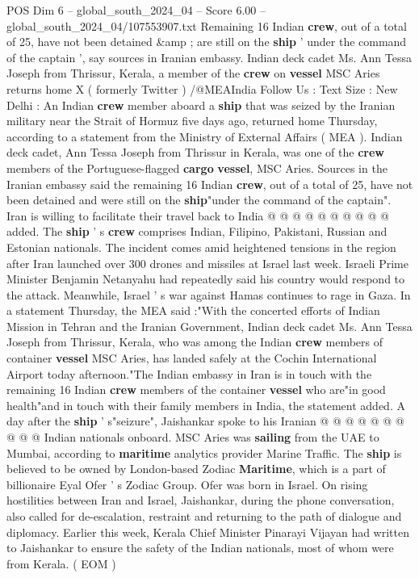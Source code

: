 \begin{textsample}{POS Dim 6 – global\_south\_2024\_04 – Score 6.00 – global\_south\_2024\_04/107553907.txt}  \label{ex:f6_pos_128}
Remaining 16 Indian \textbf{crew}, out of a total of 25, have not been detained \&amp ; are still on the \textbf{ship} ' under the command of the captain ', say sources in Iranian embassy.
Indian deck cadet Ms.
Ann Tessa Joseph from Thrissur, Kerala, a member of the \textbf{crew} on \textbf{vessel} MSC Aries returns home X ( formerly Twitter ) /@MEAIndia Follow Us : Text Size : New Delhi : An Indian \textbf{crew} member aboard a \textbf{ship} that was seized by the Iranian military near the Strait of Hormuz five days ago, returned home Thursday, according to a statement from the Ministry of External Affairs ( MEA ).
Indian deck cadet, Ann Tessa Joseph from Thrissur in Kerala, was one of the \textbf{crew} members of the Portuguese-flagged \textbf{cargo} \textbf{vessel}, MSC Aries.
Sources in the Iranian embassy said the remaining 16 Indian \textbf{crew}, out of a total of 25, have not been detained and were still on the \textbf{ship}"under the command of the captain".
Iran is willing to facilitate their travel back to India @ @ @ @ @ @ @ @ @ @ added.
The \textbf{ship} ' s \textbf{crew} comprises Indian, Filipino, Pakistani, Russian and Estonian nationals.
The incident comes amid heightened tensions in the region after Iran launched over 300 drones and missiles at Israel last week.
Israeli Prime Minister Benjamin Netanyahu had repeatedly said his country would respond to the attack.
Meanwhile, Israel ' s war against Hamas continues to rage in Gaza.
In a statement Thursday, the MEA said :"With the concerted efforts of Indian Mission in Tehran and the Iranian Government, Indian deck cadet Ms.
Ann Tessa Joseph from Thrissur, Kerala, who was among the Indian \textbf{crew} members of container \textbf{vessel} MSC Aries, has landed safely at the Cochin International Airport today afternoon."The Indian embassy in Iran is in touch with the remaining 16 Indian \textbf{crew} members of the container \textbf{vessel} who are"in good health"and in touch with their family members in India, the statement added.
A day after the \textbf{ship} ' s"seizure", Jaishankar spoke to his Iranian @ @ @ @ @ @ @ @ @ @ Indian nationals onboard.
MSC Aries was \textbf{sailing} from the UAE to Mumbai, according to \textbf{maritime} analytics provider Marine Traffic.
The \textbf{ship} is believed to be owned by London-based Zodiac \textbf{Maritime}, which is a part of billionaire Eyal Ofer ' s Zodiac Group.
Ofer was born in Israel.
On rising hostilities between Iran and Israel, Jaishankar, during the phone conversation, also called for de-escalation, restraint and returning to the path of dialogue and diplomacy.
Earlier this week, Kerala Chief Minister Pinarayi Vijayan had written to Jaishankar to ensure the safety of the Indian nationals, most of whom were from Kerala. ( EOM )

\end{textsample}
